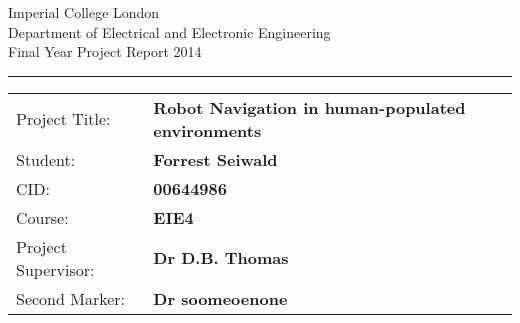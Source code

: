 \documentclass[report.tex]{subfiles}
\begin{document}
\begin{titlepage}
\setlength{\parindent}{0pt}
\setlength{\parskip}{0pt}

{
\Large
\raggedright
Imperial College London\\[17pt]
Department of Electrical and Electronic Engineering\\[17pt]
Final Year Project Report 2014\\[17pt]

}
\rule{\columnwidth}{3pt}

\vfill

\centering

\vfill

\setlength{\tabcolsep}{0pt}
\begin{tabular}{p{40mm}p{\dimexpr\columnwidth-40mm}}
Project Title: & \textbf{Robot Navigation in human-populated environments} \\[12pt]
Student: & \textbf{Forrest Seiwald} \\[12pt]
CID: & \textbf{00644986} \\[12pt]
Course: & \textbf{EIE4} \\[12pt]
Project Supervisor: & \textbf{Dr D.B. Thomas} \\[12pt]
Second Marker: & \textbf{Dr soomeoenone} \\
\end{tabular}
\end{titlepage}
\end{document}
